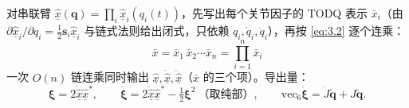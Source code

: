 对串联臂 $\hat{\underline x}(\boldsymbol q)=\prod_i\hat{\underline x}_i(q_i(t))$，先写出每个关节因子的 TODQ 表示 $\bar x_i$（由 $\partial\hat{\underline x}_i/\partial q_i=\tfrac12\boldsymbol s_i\hat{\underline x}_i$ 与链式法则给出闭式，只依赖 $q_i,\dot q_i,\ddot q_i$），再按 \eqref{eq:3.2} 逐个连乘：
\begin{equation}
\bar x=\bar x_1\,\bar x_2\cdots\bar x_n=\prod_{i=1}^{n}\bar x_i
\tag{3.4}\label{eq:3.4}
\end{equation}
一次 $O(n)$ 链连乘同时输出 $\hat{\underline x},\dot{\hat{\underline x}},\ddot{\hat{\underline x}}$（$\bar x$ 的三个项）。导出量：
\begin{equation}
\boldsymbol\xi=2\dot{\hat{\underline x}}\hat{\underline x}^*,\qquad
\dot{\boldsymbol\xi}=2\ddot{\hat{\underline x}}\hat{\underline x}^*-\tfrac12\boldsymbol\xi^2\ \text{（取纯部）},\qquad
\mathrm{vec}_6\dot{\boldsymbol\xi}=\dot J\dot{\boldsymbol q}+J\ddot{\boldsymbol q}.
\tag{3.5}\label{eq:3.5}
\end{equation}
